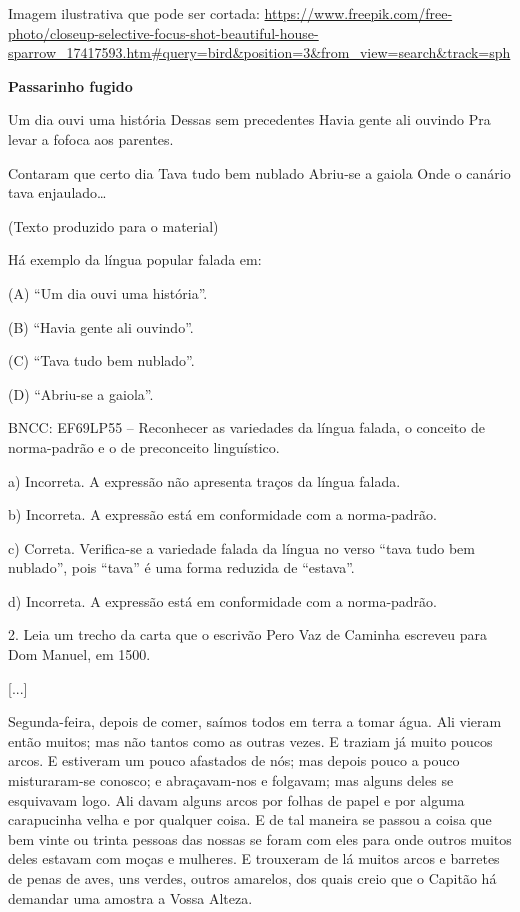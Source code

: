\begin{itemize}
\begin{itemize}
Imagem ilustrativa que pode ser cortada:
\url{https://www.freepik.com/free-photo/closeup-selective-focus-shot-beautiful-house-sparrow_17417593.htm\#query=bird\&position=3\&from_view=search\&track=sph}

\textbf{Passarinho fugido}

Um dia ouvi uma história Dessas sem precedentes Havia gente ali ouvindo
Pra levar a fofoca aos parentes.

Contaram que certo dia Tava tudo bem nublado Abriu-se a gaiola Onde o
canário tava enjaulado\ldots{}

(Texto produzido para o material)

Há exemplo da língua popular falada em:

(A) ``Um dia ouvi uma história''.

(B) ``Havia gente ali ouvindo''.

(C) ``Tava tudo bem nublado''.

(D) ``Abriu-se a gaiola''.

BNCC: EF69LP55 -- Reconhecer as variedades da língua falada, o conceito
de norma-padrão e o de preconceito linguístico.

a) Incorreta. A expressão não apresenta traços da língua falada.

b) Incorreta. A expressão está em conformidade com a norma-padrão.

c) Correta. Verifica-se a variedade falada da língua no verso ``tava
tudo bem nublado'', pois ``tava'' é uma forma reduzida de ``estava''.

d) Incorreta. A expressão está em conformidade com a norma-padrão.

2. Leia um trecho da carta que o escrivão Pero Vaz de Caminha escreveu
para Dom Manuel, em 1500.

{[}...{]}

Segunda-feira, depois de comer, saímos todos em terra a tomar água. Ali
vieram então muitos; mas não tantos como as outras vezes. E traziam já
muito poucos arcos. E estiveram um pouco afastados de nós; mas depois
pouco a pouco misturaram-se conosco; e abraçavam-nos e folgavam; mas
alguns deles se esquivavam logo. Ali davam alguns arcos por folhas de
papel e por alguma carapucinha velha e por qualquer coisa. E de tal
maneira se passou a coisa que bem vinte ou trinta pessoas das nossas se
foram com eles para onde outros muitos deles estavam com moças e
mulheres. E trouxeram de lá muitos arcos e barretes de penas de aves,
uns verdes, outros amarelos, dos quais creio que o Capitão há demandar
uma amostra a Vossa Alteza.


\end{itemize}
\end{itemize}
